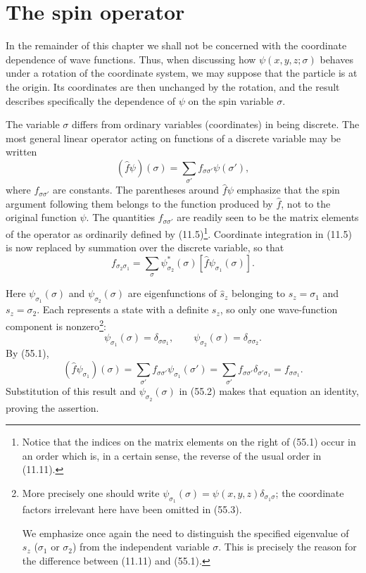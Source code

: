 \section{The spin operator}

In the remainder of this chapter we shall not be concerned with the coordinate
dependence of wave functions. Thus, when discussing how
$\psi(x,y,z;\sigma)$ behaves under a rotation of the coordinate system, we
may suppose that the particle is at the origin. Its coordinates are then
unchanged by the rotation, and the result describes specifically the
dependence of $\psi$ on the spin variable $\sigma$.

The variable $\sigma$ differs from ordinary variables (coordinates) in being
discrete. The most general linear operator acting on functions of a discrete
variable may be written
\begin{equation}
 (\hat f\psi)(\sigma)=\sum_{\sigma'}f_{\sigma\sigma'}\psi(\sigma'),
 \tag{55.1}
\end{equation}
where $f_{\sigma\sigma'}$ are constants. The parentheses around $\hat f\psi$
emphasize that the spin argument following them belongs to the function
produced by $\hat f$, not to the original function $\psi$. The quantities
$f_{\sigma\sigma'}$ are readily seen to be the matrix elements of the
operator as ordinarily defined by (11.5)\footnote{Notice that the indices on
the matrix elements on the right of (55.1) occur in an order which is, in a
certain sense, the reverse of the usual order in (11.11).}. Coordinate
integration in (11.5) is now replaced by summation over the discrete variable,
so that
\begin{equation}
 f_{\sigma_2\sigma_1}=\sum_\sigma
 \psi_{\sigma_2}^*(\sigma)[\hat f\psi_{\sigma_1}(\sigma)].
 \tag{55.2}
\end{equation}

Here $\psi_{\sigma_1}(\sigma)$ and $\psi_{\sigma_2}(\sigma)$ are
eigenfunctions of $\hat s_z$ belonging to $s_z=\sigma_1$ and
$s_z=\sigma_2$. Each represents a state with a definite $s_z$, so only one
wave-function component is nonzero\footnote{More precisely one should write
$\psi_{\sigma_1}(\sigma)=\psi(x,y,z)\delta_{\sigma_1\sigma}$; the coordinate
factors irrelevant here have been omitted in (55.3).

We emphasize once again the need to distinguish the specified eigenvalue of
$s_z$ ($\sigma_1$ or $\sigma_2$) from the independent variable $\sigma$.
This is precisely the reason for the difference between (11.11) and (55.1).}:
\begin{equation}
 \psi_{\sigma_1}(\sigma)=\delta_{\sigma\sigma_1},\qquad
 \psi_{\sigma_2}(\sigma)=\delta_{\sigma\sigma_2}.
 \tag{55.3}
\end{equation}
By (55.1),
\[
 (\hat f\psi_{\sigma_1})(\sigma)=
 \sum_{\sigma'}f_{\sigma\sigma'}\psi_{\sigma_1}(\sigma')=
 \sum_{\sigma'}f_{\sigma\sigma'}\delta_{\sigma'\sigma_1}
 =f_{\sigma\sigma_1}.
\]
Substitution of this result and $\psi_{\sigma_2}(\sigma)$ in (55.2) makes
that equation an identity, proving the assertion.

